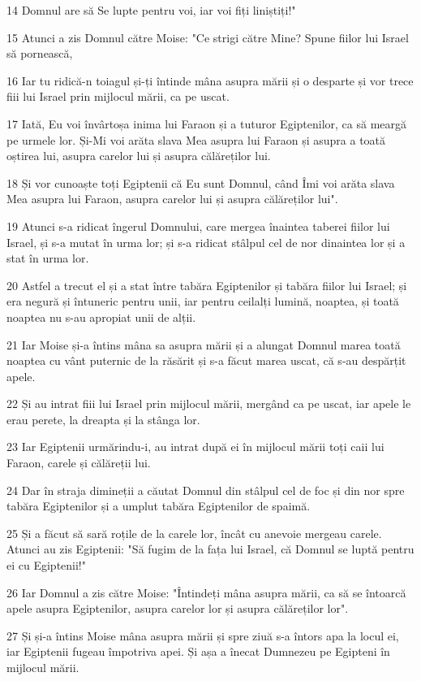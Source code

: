 \par 14 Domnul are să Se lupte pentru voi, iar voi fiți liniștiți!"
\par 15 Atunci a zis Domnul către Moise: "Ce strigi către Mine? Spune fiilor lui Israel să pornească,
\par 16 Iar tu ridică-n toiagul și-ți întinde mâna asupra mării și o desparte și vor trece fiii lui Israel prin mijlocul mării, ca pe uscat.
\par 17 Iată, Eu voi învârtoșa inima lui Faraon și a tuturor Egiptenilor, ca să meargă pe urmele lor. Și-Mi voi arăta slava Mea asupra lui Faraon și asupra a toată oștirea lui, asupra carelor lui și asupra călăreților lui.
\par 18 Și vor cunoaște toți Egiptenii că Eu sunt Domnul, când Îmi voi arăta slava Mea asupra lui Faraon, asupra carelor lui și asupra călăreților lui".
\par 19 Atunci s-a ridicat îngerul Domnului, care mergea înaintea taberei fiilor lui Israel, și s-a mutat în urma lor; și s-a ridicat stâlpul cel de nor dinaintea lor și a stat în urma lor.
\par 20 Astfel a trecut el și a stat între tabăra Egiptenilor și tabăra fiilor lui Israel; și era negură și întuneric pentru unii, iar pentru ceilalți lumină, noaptea, și toată noaptea nu s-au apropiat unii de alții.
\par 21 Iar Moise și-a întins mâna sa asupra mării și a alungat Domnul marea toată noaptea cu vânt puternic de la răsărit și s-a făcut marea uscat, că s-au despărțit apele.
\par 22 Și au intrat fiii lui Israel prin mijlocul mării, mergând ca pe uscat, iar apele le erau perete, la dreapta și la stânga lor.
\par 23 Iar Egiptenii urmărindu-i, au intrat după ei în mijlocul mării toți caii lui Faraon, carele și călăreții lui.
\par 24 Dar în straja dimineții a căutat Domnul din stâlpul cel de foc și din nor spre tabăra Egiptenilor și a umplut tabăra Egiptenilor de spaimă.
\par 25 Și a făcut să sară roțile de la carele lor, încât cu anevoie mergeau carele. Atunci au zis Egiptenii: "Să fugim de la fața lui Israel, că Domnul se luptă pentru ei cu Egiptenii!"
\par 26 Iar Domnul a zis către Moise: "Întindeți mâna asupra mării, ca să se întoarcă apele asupra Egiptenilor, asupra carelor lor și asupra călăreților lor".
\par 27 Și și-a întins Moise mâna asupra mării și spre ziuă s-a întors apa la locul ei, iar Egiptenii fugeau împotriva apei. Și așa a înecat Dumnezeu pe Egipteni în mijlocul mării.
